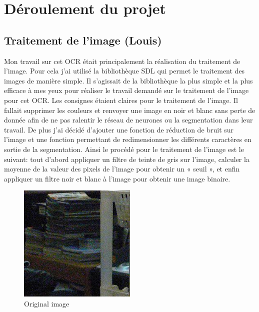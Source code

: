 \documentclass[12pt]{report}
\begin{document}
\chapter{Déroulement du projet}

\section{Traitement de l'image (Louis)}

Mon travail sur cet OCR était principalement la réalisation du traitement de l’image. Pour cela j’ai utilisé la bibliothèque SDL qui permet le traitement des images de manière simple. Il s’agissait de la bibliothèque la plus simple et la plus efficace à mes yeux pour réaliser le travail demandé sur le traitement de l’image pour cet OCR. 
Les consignes étaient claires pour le traitement de l’image. Il fallait supprimer les couleurs et renvoyer une image en noir et blanc sans perte de donnée afin de ne pas ralentir le réseau de neurones ou la segmentation dans leur travail. De plus j’ai décidé d’ajouter une fonction de réduction de bruit sur l’image et une fonction permettant de redimensionner les différents caractères en sortie de la segmentation.
Ainsi le procédé pour le traitement de l’image est le suivant: tout d’abord appliquer un filtre de teinte de gris sur l’image, calculer la moyenne de la valeur des pixels de l’image pour obtenir un « seuil », et enfin appliquer un filtre noir et blanc à l’image pour obtenir une image binaire.

\begin{figure}[H]
    \centering
    \includegraphics[width=0.5\textwidth]{noise}
    \caption{Original image}
\end{figure}
\end{document}
